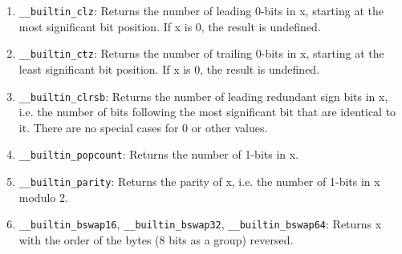 \begin{enumerate}
\item \texttt{\_\_builtin\_clz}: Returns the number of leading 0-bits in x, starting at the most significant bit position. If x is 0, the result is undefined.
\item \texttt{\_\_builtin\_ctz}: Returns the number of trailing 0-bits in x, starting at the least significant bit position. If x is 0, the result is undefined.
\item \texttt{\_\_builtin\_clrsb}: Returns the number of leading redundant sign bits in x, i.e. the number of bits following the most significant bit that are identical to it. There are no special cases for 0 or other values.
\item \texttt{\_\_builtin\_popcount}: Returns the number of 1-bits in x.
\item \texttt{\_\_builtin\_parity}: Returns the parity of x, i.e. the number of 1-bits in x modulo 2.
\item \texttt{\_\_builtin\_bswap16}, \texttt{\_\_builtin\_bswap32}, \texttt{\_\_builtin\_bswap64}: Returns x with the order of the bytes (8 bits as a group) reversed.
\end{enumerate}

